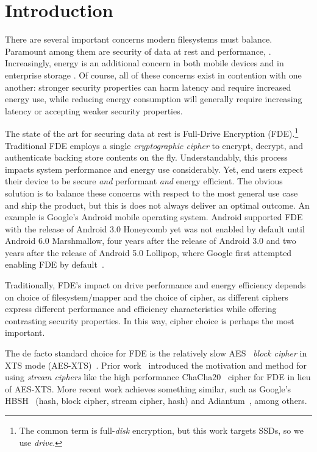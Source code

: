 \section{Introduction}\label{sec:introduction}

There are several important concerns modern filesystems must balance. Paramount
among them are security of data at rest and performance, . Increasingly, energy is an additional concern in both mobile
devices \cite{android-M-mobile-motivation} and in enterprise storage
\cite{enterprise-motivation}. Of course, all of these concerns exist in
contention with one another: stronger security properties can harm latency and
require increased energy use, while reducing energy consumption will generally
require increasing latency or accepting weaker security properties.

The state of the art for securing data at rest is Full-Drive Encryption
(FDE).\footnote{The common term is full-\emph{disk} encryption, but this work
targets SSDs, so we use \emph{drive}.} Traditional FDE employs a single
\emph{cryptographic cipher} to encrypt, decrypt, and authenticate backing store
contents on the fly. Understandably, this process impacts system performance and
energy use considerably. Yet, end users expect their device to be secure
\emph{and} performant \emph{and} energy efficient. The obvious solution is to
balance these concerns with respect to the most general use case and ship the
product, but this is does not always deliver an optimal outcome. An example is
Google's Android mobile operating system. Android supported FDE with the release
of Android 3.0 Honeycomb yet was not enabled by default until Android 6.0
Marshmallow, four years after the release of Android 3.0 and two years after the
release of Android 5.0 Lollipop, where Google first attempted enabling FDE by
default~\cite{android-M-mobile-motivation}.

Traditionally, FDE's impact on drive performance and energy efficiency depends
on choice of filesystem/mapper and the choice of cipher, as different ciphers
express different performance and efficiency characteristics while offering
contrasting security properties. In this way, cipher choice is perhaps the most
important.

The de facto standard choice for FDE is the relatively slow AES~\cite{AES}
\emph{block cipher} in XTS mode (AES-XTS)~\cite{AES-XTS}. Prior
work~\cite{StrongBox} introduced the motivation and method for using
\emph{stream ciphers} like the high performance ChaCha20~\cite{ChaCha20} cipher
for FDE in lieu of AES-XTS. More recent work achieves something similar, such as
Google's HBSH~\cite{HBSH} (hash, block cipher, stream cipher, hash) and
Adiantum~\cite{Adiantum}, among others.

